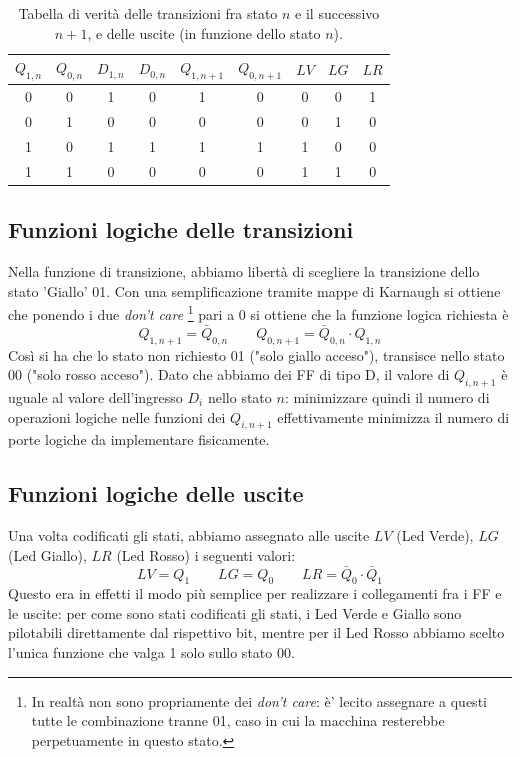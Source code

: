 \documentclass[10pt,a4paper]{article}
\begin{document}

\begin{table}[!htb]
\centering
\begin{tabular}{|c|c|c|c||c|c||c|c|c|}
\hline
$Q_{1,n}$ & $Q_{0,n}$ & $D_{1, n}$ & $D_{0, n}$& $Q_{1,n+1}$ & $Q_{0,n+1}$ & $LV$ & $LG$ & $LR$\\
\hline
0 & 0 & 1 & 0 & 1 & 0 & 0 & 0 & 1 \\
0 & 1 & 0 & 0 & 0 & 0 & 0 & 1 & 0\\
1 & 0 & 1 & 1 & 1 & 1 & 1 & 0 & 0\\
1 & 1 & 0 & 0 & 0 & 0 & 1 & 1 & 0\\
\hline
\end{tabular}
\caption{Tabella di verità delle transizioni fra stato $n$ e il successivo $n+1$, e delle uscite (in funzione dello stato $n$).\label{tab:transizioneenabled}}
\end{table}
\subsection{Funzioni logiche delle transizioni}
Nella funzione di transizione, abbiamo libertà di scegliere la transizione dello stato 'Giallo' 01.
Con una semplificazione tramite mappe di Karnaugh si ottiene che ponendo i due \emph{don't care} 
\footnote{In realtà non sono propriamente dei \emph{don't care}: è' lecito assegnare a questi  tutte le combinazione tranne 01, caso in cui la macchina resterebbe perpetuamente in questo stato.} pari a 0 si ottiene che la funzione logica richiesta è \begin{equation}
Q_{1, n+1} = \bar {Q}_{0,n} \qquad Q_{0,n+1} = \bar {Q}_{0,n} \cdot Q_{1,n} 
\end{equation}
Così si ha che lo stato non richiesto 01 ("solo giallo acceso"), transisce nello stato 00 ("solo rosso acceso").
Dato che abbiamo dei FF di tipo D, il valore di $Q_{i, n+1}$ è uguale al valore dell'ingresso $D_i$ nello stato $n$: minimizzare quindi il numero di operazioni logiche nelle funzioni dei $Q_{i,n+1}$ effettivamente minimizza il numero di porte logiche da implementare fisicamente.

\subsection{Funzioni logiche delle uscite}
Una volta codificati gli stati, abbiamo assegnato alle uscite $LV$ (Led Verde), $LG$ (Led Giallo), $LR$ (Led Rosso) i seguenti valori:
\begin{equation}
LV = Q_1 \qquad LG = Q_0 \qquad LR = \bar{Q}_0\cdot \bar{Q}_1
\end{equation}
Questo era in effetti il modo più semplice per realizzare i collegamenti fra i FF e le uscite: per come sono stati codificati gli stati, i Led Verde e Giallo sono pilotabili direttamente dal rispettivo bit, mentre per il Led Rosso abbiamo scelto l'unica funzione che valga 1 solo sullo stato 00. 
\end{document}
